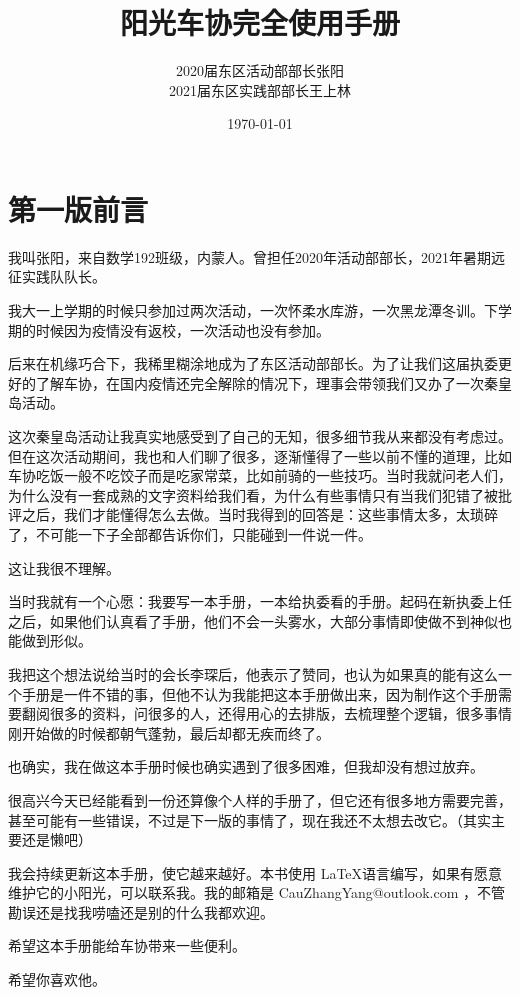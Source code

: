 \documentclass{ctexbook}
\title{阳光车协完全使用手册}
\author{
    2020届东区活动部部长张阳\\
    2021届东区实践部部长王上林
    }
\date{\today}
\begin{document}
\setlength{\baselineskip}{22pt}
\maketitle
\newpage
\pagestyle{empty}
\frontmatter

\chapter{第一版前言}
我叫张阳，来自数学192班级，内蒙人。曾担任2020年活动部部长，2021年暑期远征实践队队长。

我大一上学期的时候只参加过两次活动，一次怀柔水库游，一次黑龙潭冬训。下学期的时候因为疫情没有返校，一次活动也没有参加。

后来在机缘巧合下，我稀里糊涂地成为了东区活动部部长。为了让我们这届执委更好的了解车协，在国内疫情还完全解除的情况下，理事会带领我们又办了一次秦皇岛活动。

这次秦皇岛活动让我真实地感受到了自己的无知，很多细节我从来都没有考虑过。但在这次活动期间，我也和人们聊了很多，逐渐懂得了一些以前不懂的道理，比如车协吃饭一般不吃饺子而是吃家常菜，比如前骑的一些技巧。当时我就问老人们，为什么没有一套成熟的文字资料给我们看，为什么有些事情只有当我们犯错了被批评之后，我们才能懂得怎么去做。当时我得到的回答是：这些事情太多，太琐碎了，不可能一下子全部都告诉你们，只能碰到一件说一件。

这让我很不理解。

当时我就有一个心愿：我要写一本手册，一本给执委看的手册。起码在新执委上任之后，如果他们认真看了手册，他们不会一头雾水，大部分事情即使做不到神似也能做到形似。

我把这个想法说给当时的会长李琛后，他表示了赞同，也认为如果真的能有这么一个手册是一件不错的事，但他不认为我能把这本手册做出来，因为制作这个手册需要翻阅很多的资料，问很多的人，还得用心的去排版，去梳理整个逻辑，很多事情刚开始做的时候都朝气蓬勃，最后却都无疾而终了。

也确实，我在做这本手册时候也确实遇到了很多困难，但我却没有想过放弃。

很高兴今天已经能看到一份还算像个人样的手册了，但它还有很多地方需要完善，甚至可能有一些错误，不过是下一版的事情了，现在我还不太想去改它。（其实主要还是懒吧）


我会持续更新这本手册，使它越来越好。本书使用 \LaTeX 语言编写，如果有愿意维护它的小阳光，可以联系我。我的邮箱是 CauZhangYang@outlook.com ，不管勘误还是找我唠嗑还是别的什么我都欢迎。

希望这本手册能给车协带来一些便利。

希望你喜欢他。
\end{document}
